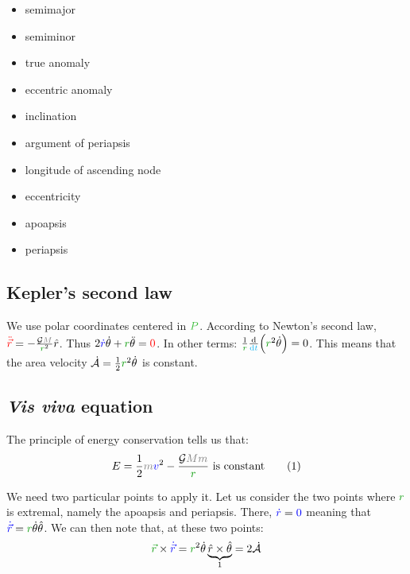 \begin{itemize}
\item semimajor
\item semiminor
\item true anomaly
\item eccentric anomaly
\item inclination
\item argument of periapsis
\item longitude of ascending node
\item eccentricity
\item apoapsis
\item periapsis
\end{itemize}


\subsection{Kepler's second law}

We use polar coordinates centered in $\posit{P}$. According to Newton's
second law, $\accel{\ddot{\vec r}} = - \frac {\mathcal G \mass{M}}
{\dist{r}^2} \hat r$. Thus $2 \speed{\dot r} \dot \theta + \dist{r}
\ddot \theta = \accel{0}$. In other terms: $\frac 1 {\dist{r}} \frac {\d}
{\delay{\dt}} \Big(\dist{r}^2 \dot \theta\Big) = 0$. This means that the
area velocity $\dot {\mathcal A} = \frac 1 2 \dist{r}^2 \dot \theta$
is constant.


\subsection{\emph{Vis viva} equation}

The principle of energy conservation tells us that:
\[
E
=
\frac 1 2 \mass{m} \speed{v}^2
- \frac {\mathcal G \mass{M} \mass{m}} {\dist{r}}
\text{ is constant}
\eqtag{eql:orbenergy}
\]

We need two particular points to apply it. Let us consider the two points
where $\dist{r}$ is extremal, namely the apoapsis and periapsis. There,
$\textcolor{blue}{\dot r} = \textcolor{blue}{0}$ meaning that $\speed{\dot{\vec r}} = \dist{r}
\dot \theta \hat \theta$. We can then note that, at these two points:
\[
\dist{\vec r} \times \speed{\dot{\vec r}}
=
\dist{r}^2 \dot \theta \underbrace{\hat r \times \hat \theta}_1
= 2 \dot{\mathcal A}
\]

